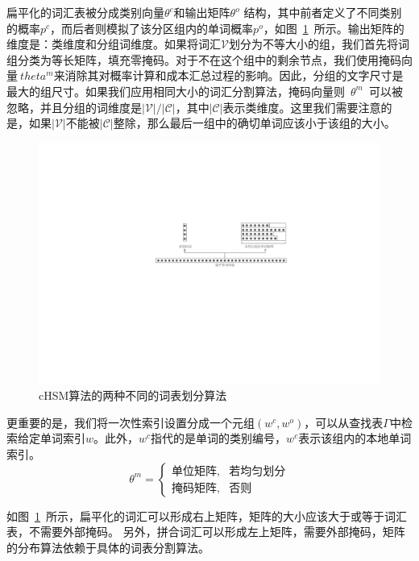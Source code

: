 扁平化的词汇表被分成类别向量$ \theta^c $和输出矩阵$ \theta^o $ 结构，其中前者定义了不同类别的概率$ p ^ c $，而后者则模拟了该分区组内的单词概率$ p ^ o $，如图~\ref {fig:chsm}~所示。输出矩阵的维度是：类维度和分组词维度。如果将词汇$ \mathcal {V} $划分为不等大小的组，我们首先将词组分类为等长矩阵，填充零掩码。对于不在这个组中的剩余节点，我们使用掩码向量$ \ theta ^ m $来消除其对概率计算和成本汇总过程的影响。因此，分组的文字尺寸是最大的组尺寸。如果我们应用相同大小的词汇分割算法，掩码向量则~$\theta^m$~可以被忽略，并且分组的词维度是$ \mathcal {| V | / | C |} $，其中$ \mathcal {| C |} $表示类维度。这里我们需要注意的是，如果$ \mathcal {| V |} $不能被$ \mathcal {| C |} $整除，那么最后一组中的确切单词应该小于该组的大小。
\begin{figure}[!ht]
  \centering
\includegraphics[width=0.85\linewidth]{./figures/chsm-simple.pdf}
\caption{cHSM算法的两种不同的词表划分算法}\label{fig:chsm}
\end{figure}


更重要的是，我们将一次性索引设置分成一个元组$(w ^ c,w ^ o)$，可以从查找表$\Gamma $中检索给定单词索引$ w $。此外，$ w ^ c $指代的是单词的类别编号，$ w^c $表示该组内的本地单词索引。
\begin{equation}\label{equ:partition}
 \theta^m=
\begin{cases}
    \text{单位矩阵} ,& \text{若均匀划分} \\
    \text{掩码矩阵},   & \text{否则}
\end{cases}
\end{equation}


如图~\ref{fig:chsm}~所示，扁平化的词汇可以形成右上矩阵，矩阵的大小应该大于或等于词汇表，不需要外部掩码。
另外，拼合词汇可以形成左上矩阵，需要外部掩码，矩阵的分布算法依赖于具体的词表分割算法。

